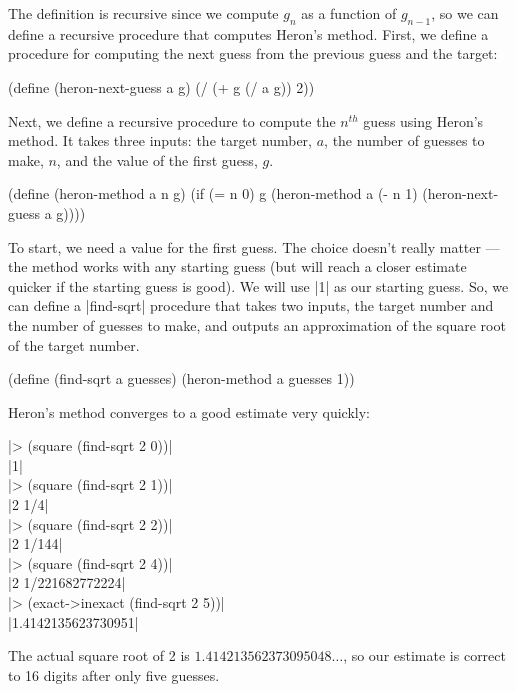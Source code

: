 \begin{schemeregion}
{The definition is recursive since we compute $g_n$ as a function of $g_{n-1}$, so we can define a recursive procedure that computes Heron's method.  First, we define a procedure for computing the next guess from the previous guess and the target:
\begin{schemedisplay}
(define (heron-next-guess a g) (/ (+ g (/ a g)) 2))
\end{schemedisplay}
Next, we define a recursive procedure to compute the $n^{th}$ guess using Heron's method.  It takes three inputs: the target number, $a$, the number of guesses to make, $n$, and the value of the first guess, $g$.
\begin{schemedisplay}
(define (heron-method a n g)
  (if (= n 0)
      g
      (heron-method a (- n 1) (heron-next-guess a g))))
\end{schemedisplay}
To start, we need a value for the first guess.  The choice doesn't really matter --- the method works with any starting guess (but will reach a closer estimate quicker if the starting guess is good).  We will use \scheme|1| as our starting guess.  So, we can define a \scheme|find-sqrt| procedure that takes two inputs, the target number and the number of guesses to make, and outputs an approximation of the square root of the target number.
\begin{schemedisplay}
(define (find-sqrt a guesses)
  (heron-method a guesses 1))
\end{schemedisplay}
Heron's method converges to a good estimate very quickly:
\begin{code}
\scheme|> (square (find-sqrt 2 0))|\\
\schemeresult|1|\\
\scheme|> (square (find-sqrt 2 1))|\\
\schemeresult|2 1/4|\\
\scheme|> (square (find-sqrt 2 2))|\\
\schemeresult|2 1/144|\\
\scheme|> (square (find-sqrt 2 4))|\\
\schemeresult|2 1/221682772224|\\
\scheme|> (exact->inexact (find-sqrt 2 5))|\\
\schemeresult|1.4142135623730951|\\
\end{code}
The actual square root of 2 is $1.414213562373095048\ldots$, so our estimate is correct to 16 digits after only five guesses.

}
\end{schemeregion}
